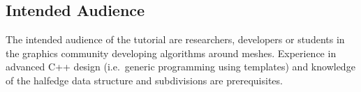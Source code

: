 \documentclass[letter,twocolumn]{article}
\begin{document}
\subsection*{Intended Audience}

The intended audience of the tutorial are researchers, developers or
students in the graphics community developing algorithms around
meshes. Experience in advanced C++ design (i.e.\ generic programming
using templates) and knowledge of the halfedge data structure and
subdivisions are prerequisites.
\end{document}
